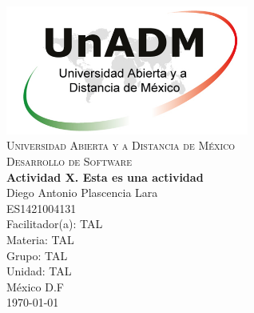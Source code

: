 \documentclass[spanish,12pt,letterpapper]{article}
\begin{document}
	\begin{titlepage}
		\begin{center}
			\includegraphics[width=0.6\textwidth]{./logoUnADM}~\\[1cm] 
			\textsc{Universidad Abierta y a Distancia de México}\\[0.8cm]
			\textsc{Desarrollo de Software}\\[1.8cm]
			
			\textbf{ \Large Actividad X. Esta es una actividad}\\[3cm]
			
			Diego Antonio Plascencia Lara\\ ES1421004131 \\[0.4cm]
			Facilitador(a): TAL\\
			Materia: TAL\\
			Grupo: TAL \\
			Unidad: TAL \\
			
			\vfill México D.F\\{\today}
			
		\end{center}
	\end{titlepage}
\end{document}
